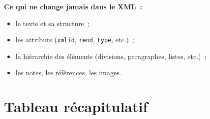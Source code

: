 \documentclass[11pt,a4paper]{article}
\newcommand{\attrib}[1]{\texttt{#1}}
\begin{document}
	\medskip
	\textbf{Ce qui ne change jamais dans le XML~:}
	\begin{itemize}
		\item le texte et sa structure~;
		\item les attributs (\attrib{xmlid}, \attrib{rend}, \attrib{type}, etc.)~;
		\item la hiérarchie des éléments (divisions, paragraphes, listes, etc.)~;
		\item les notes, les références, les images.
	\end{itemize}
	
	\section{Tableau récapitulatif}
	
\end{document}
